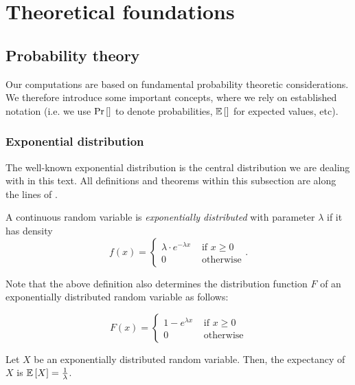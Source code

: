 \chapter{Theoretical foundations}
\label{chap:theoretical-foundations}

\section{Probability theory}
\label{sec:some-probability}

Our computations are based on fundamental probability theoretic considerations. We therefore introduce some important concepts, where we rely on established notation (i.e. we use $\operatorname{Pr}\left[\right]$ to denote probabilities, $\mathbb{E}\left[  \right]$ for expected values, etc).

\subsection{Exponential distribution}
\label{sec:exponential-distribution}

The well-known exponential distribution is the central distribution we are dealing with in this text. All definitions and theorems within this subsection are along the lines of \cite{schickinger2001diskrete}.

\begin{definition}
  A continuous random variable is \emph{exponentially distributed} with parameter $\lambda$ if it has density 
  \begin{equation*}
    f(x) =
    \begin{cases}
      \lambda \cdot e^{-\lambda x} & \text{ if } x \geq 0 
      \\ 0 & \text{ otherwise}
    \end{cases}
    .
  \end{equation*}
\end{definition}

Note that the above definition also determines the distribution function $F$ of an exponentially distributed random variable as follows:

\begin{equation*}
  F(x) =
  \begin{cases}
    1-e^{\lambda x} & \text{ if } x \geq 0 \\
    0 & \text{ otherwise}
  \end{cases}
\end{equation*}

\begin{theorem}
  \label{thm:exponential-distribution-expectancy}
  Let $X$ be an exponentially distributed random variable. Then, the expectancy of $X$ is $\mathbb{E}\left[ X \right] = \frac 1 \lambda$.
\end{theorem}

